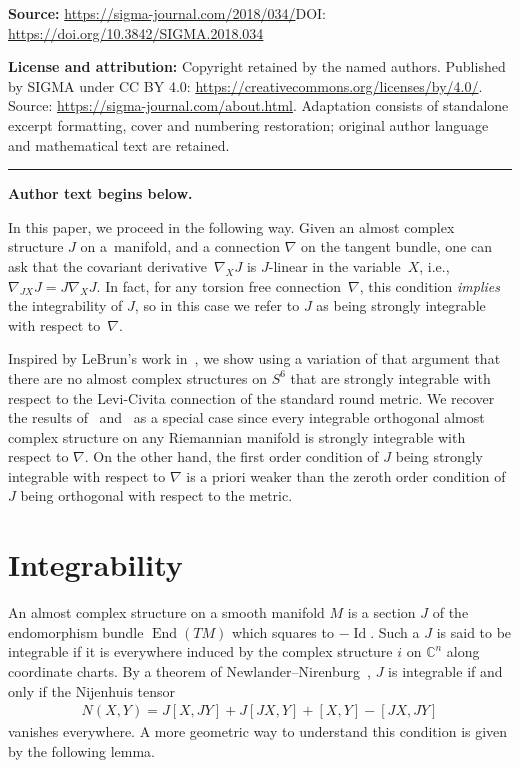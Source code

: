 \documentclass[11pt]{article}
\numberwithin{equation}{section}
\newcommand{\CC}{\mathbb{C}}
\begin{document}
\noindent\textbf{Source:} \url{https://sigma-journal.com/2018/034/}\quad DOI: \url{https://doi.org/10.3842/SIGMA.2018.034}\par
\noindent\textbf{License and attribution:} Copyright retained by the named authors. Published by SIGMA under CC BY 4.0: \url{https://creativecommons.org/licenses/by/4.0/}. Source: \url{https://sigma-journal.com/about.html}. Adaptation consists of standalone excerpt formatting, cover and numbering restoration; original author language and mathematical text are retained.\par
\medskip\hrule\medskip\noindent\textbf{Author text begins below.}\par
\setcounter{section}{1}
\setcounter{subsection}{0}
\setcounter{subsubsection}{0}
\setcounter{thm}{0}
\setcounter{equation}{0}
In this paper, we proceed in the following way. Given an almost complex structure $J$ on a~manifold, and a connection $\nabla$ on the tangent bundle, one can ask that the covariant derivative~$\nabla_X J$ is $J$-linear in the variable~$X$, i.e., $\nabla_{J X } J = J \nabla_X J$. In fact, for any torsion free connection~$\nabla$, this condition \emph{implies} the integrability of $J$, so in this case we refer to $J$ as being strongly integrable with respect to~$\nabla$.

Inspired by LeBrun's work in~\cite{L}, we show using a variation of that argument that there are no almost complex structures on $S^6$ that are strongly integrable with respect to the Levi-Civita connection of the standard round metric. We recover the results of~\cite{Bl} and~\cite{L} as a special case since every integrable orthogonal almost complex structure on any Riemannian manifold is strongly integrable with respect to $\nabla$. On the other hand, the first order condition of $J$ being strongly integrable with respect to $\nabla$ is a priori weaker than the zeroth order condition of $J$ being orthogonal with respect to the metric.

\setcounter{section}{1}
\setcounter{subsection}{0}
\setcounter{subsubsection}{0}
\setcounter{thm}{0}
\setcounter{equation}{0}
\section{Integrability} \label{sec;int}

An almost complex structure on a smooth manifold $M$ is a section $J$ of the endomorphism bundle $\operatorname{End}(TM)$ which squares to $-\operatorname{Id}$. Such a $J$ is said to be integrable if it is everywhere induced by the complex structure $i$ on $\CC^n$ along coordinate charts. By a theorem of Newlander--Nirenburg~\cite{NN}, $J$ is integrable if and only if the Nijenhuis tensor
\begin{gather} \label{eq:N}
N(X,Y) = J[X,JY] + J[JX,Y] + [X,Y] - [JX,JY]
\end{gather}
vanishes everywhere. A more geometric way to understand this condition is given by the following lemma.
\end{document}
